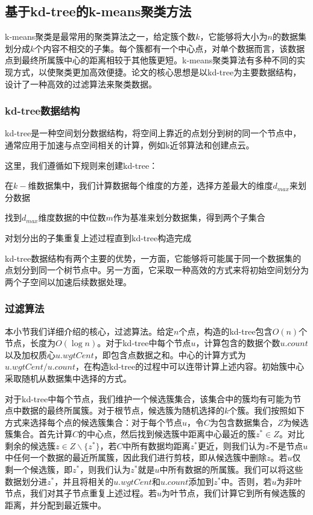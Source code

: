 \subsection{基于kd-tree的k-means聚类方法}
k-means聚类是最常用的聚类算法之一，给定簇个数$ k $，它能够将大小为$ n $的数据集划分成$ k $个内容不相交的子集。每个簇都有一个中心点，对单个数据而言，该数据点到最终所属簇中心的距离相较于其他簇更短。k-means聚类算法有多种不同的实现方式，以使聚类更加高效便捷。\cite{kanungo2002efficient}论文的核心思想是以kd-tree为主要数据结构，设计了一种高效的过滤算法来聚类数据。

\subsubsection{kd-tree数据结构}
kd-tree是一种空间划分数据结构，将空间上靠近的点划分到树的同一个节点中\cite{el2020kd}，通常应用于加速与点空间相关的计算，例如k近邻算法和创建点云。

这里，我们遵循如下规则来创建kd-tree：
\begin{compactitem}
	\item 在$ k- $维数据集中，我们计算数据每个维度的方差，选择方差最大的维度$ d_{max} $来划分数据
	\item 找到$ d_{max} $维度数据的中位数$ m $作为基准来划分数据集，得到两个子集合
	\item 对划分出的子集重复上述过程直到kd-tree构造完成
\end{compactitem}

kd-tree数据结构有两个主要的优势，一方面，它能够将可能属于同一个数据集的点划分到同一个树节点中。另一方面，它采取一种高效的方式来将初始空间划分为两个子空间以加速后续数据处理。

\subsubsection{过滤算法}
本小节我们详细介绍\cite{kanungo2002efficient}的核心，过滤算法。给定$ n $个点，构造的kd-tree包含$ O(n) $个节点，长度为$ O(\log n) $。对于kd-tree中每个节点$ u $，计算包含的数据个数$ u.count $以及加权质心$ u.wgtCent $，即包含点数据之和。中心的计算方式为$ u.wgtCent/u.count $，在构造kd-tree的过程中可以连带计算上述内容。初始簇中心采取随机从数据集中选择的方式。

对于kd-tree中每个节点，我们维护一个候选簇集合，该集合中的簇均有可能为节点中数据的最终所属簇。对于根节点，候选簇为随机选择的$ k $个簇。我们按照如下方式来选择每个点的候选簇集合：对于每个节点$ u $，令$ C $为包含数据集合，$ Z $为候选簇集合。首先计算$ C $的中心点，然后找到候选簇中距离中心最近的簇$ z^*\in Z $。对比剩余的候选簇$ z\in Z\backslash\{z^*\} $，若$ C $中所有数据均距离$ z^* $更近，则我们认为$ z $不是节点$ u $中任何一个数据的最近所属簇，因此我们进行剪枝，即从候选簇中删除$ z $。若$ u $仅剩一个候选簇，即$ z^* $，则我们认为$ z^* $就是$ u $中所有数据的所属簇。我们可以将这些数据划分进$ z^* $，并且将相关的$ u.wgtCent $和$ u.count $添加到$ z^* $中。否则，若$ u $为非叶节点，我们对其子节点重复上述过程。若$ u $为叶节点，我们计算它到所有候选簇的距离，并分配到最近簇中。
